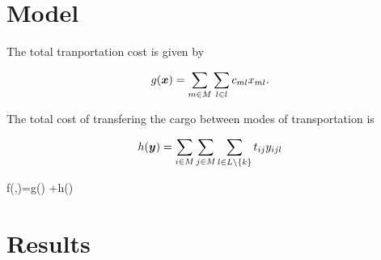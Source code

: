 \section{Model}

The total tranportation cost is given by

\begin{equation}
    g(\boldsymbol{x}) = \sum_{m\in M}\sum_{l\in l} c_{ml} x_{ml}.
\end{equation}

The total cost of transfering the cargo between modes of transportation
is

\begin{equation}
    h(\boldsymbol{y}) = \sum_{i\in M}\sum_{j\in M}\sum_{l\in L\setminus \left\lbrace k\right\rbrace}
    t_{ij}y_{ijl}
\end{equation}

\begin{mini!}
    {}{f(,)=g() +h() \protect\label{eq:e5-obj}}{\label{eq:e5}}{}
\end{mini!}

\section{Results}
